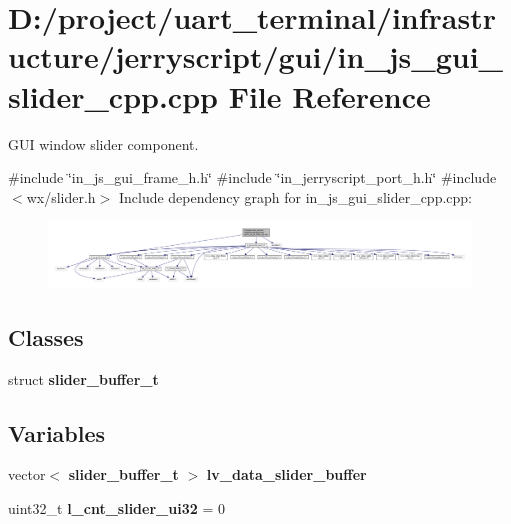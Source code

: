 \section{D\+:/project/uart\+\_\+terminal/infrastructure/jerryscript/gui/in\+\_\+js\+\_\+gui\+\_\+slider\+\_\+cpp.cpp File Reference}
\label{in__js__gui__slider__cpp_8cpp}


G\+UI window slider component.  


{\ttfamily \#include \char`\"{}in\+\_\+js\+\_\+gui\+\_\+frame\+\_\+h.\+h\char`\"{}}\newline
{\ttfamily \#include \char`\"{}in\+\_\+jerryscript\+\_\+port\+\_\+h.\+h\char`\"{}}\newline
{\ttfamily \#include $<$wx/slider.\+h$>$}\newline
Include dependency graph for in\+\_\+js\+\_\+gui\+\_\+slider\+\_\+cpp.\+cpp\+:
\nopagebreak
\begin{figure}[H]
\begin{center}
\leavevmode
\includegraphics[width=350pt]{in__js__gui__slider__cpp_8cpp__incl}
\end{center}
\end{figure}
\subsection*{Classes}
\begin{DoxyCompactItemize}
\item 
struct \textbf{ slider\+\_\+buffer\+\_\+t}
\end{DoxyCompactItemize}
\subsection*{Variables}
\begin{DoxyCompactItemize}
\item 
vector$<$ \textbf{ slider\+\_\+buffer\+\_\+t} $>$ \textbf{ lv\+\_\+data\+\_\+slider\+\_\+buffer}
\item 
uint32\+\_\+t {\bfseries l\+\_\+cnt\+\_\+slider\+\_\+ui32} = 0
\end{DoxyCompactItemize}


